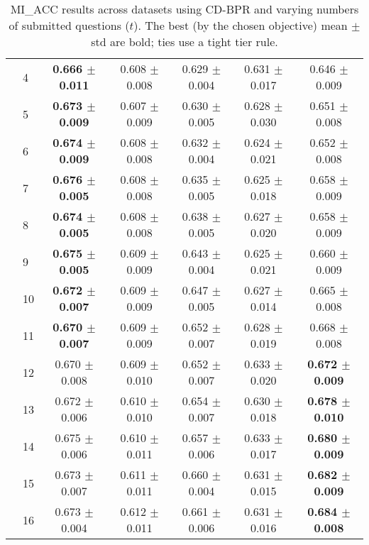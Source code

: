 \begin{table*}[t]
{\begin{tabular}{ll c c c c c}
        & 4 & \textbf{0.666 $\pm$ 0.011} & 0.608 $\pm$ 0.008 & 0.629 $\pm$ 0.004 & 0.631 $\pm$ 0.017 & 0.646 $\pm$ 0.009 \\
        & 5 & \textbf{0.673 $\pm$ 0.009} & 0.607 $\pm$ 0.009 & 0.630 $\pm$ 0.005 & 0.628 $\pm$ 0.030 & 0.651 $\pm$ 0.008 \\
        & 6 & \textbf{0.674 $\pm$ 0.009} & 0.608 $\pm$ 0.008 & 0.632 $\pm$ 0.004 & 0.624 $\pm$ 0.021 & 0.652 $\pm$ 0.008 \\
        & 7 & \textbf{0.676 $\pm$ 0.005} & 0.608 $\pm$ 0.008 & 0.635 $\pm$ 0.005 & 0.625 $\pm$ 0.018 & 0.658 $\pm$ 0.009 \\
        & 8 & \textbf{0.674 $\pm$ 0.005} & 0.608 $\pm$ 0.008 & 0.638 $\pm$ 0.005 & 0.627 $\pm$ 0.020 & 0.658 $\pm$ 0.009 \\
        & 9 & \textbf{0.675 $\pm$ 0.005} & 0.609 $\pm$ 0.009 & 0.643 $\pm$ 0.004 & 0.625 $\pm$ 0.021 & 0.660 $\pm$ 0.009 \\
        & 10 & \textbf{0.672 $\pm$ 0.007} & 0.609 $\pm$ 0.009 & 0.647 $\pm$ 0.005 & 0.627 $\pm$ 0.014 & 0.665 $\pm$ 0.008 \\
        & 11 & \textbf{0.670 $\pm$ 0.007} & 0.609 $\pm$ 0.009 & 0.652 $\pm$ 0.007 & 0.628 $\pm$ 0.019 & 0.668 $\pm$ 0.008 \\
        & 12 & 0.670 $\pm$ 0.008 & 0.609 $\pm$ 0.010 & 0.652 $\pm$ 0.007 & 0.633 $\pm$ 0.020 & \textbf{0.672 $\pm$ 0.009} \\
        & 13 & 0.672 $\pm$ 0.006 & 0.610 $\pm$ 0.010 & 0.654 $\pm$ 0.007 & 0.630 $\pm$ 0.018 & \textbf{0.678 $\pm$ 0.010} \\
        & 14 & 0.675 $\pm$ 0.006 & 0.610 $\pm$ 0.011 & 0.657 $\pm$ 0.006 & 0.633 $\pm$ 0.017 & \textbf{0.680 $\pm$ 0.009} \\
        & 15 & 0.673 $\pm$ 0.007 & 0.611 $\pm$ 0.011 & 0.660 $\pm$ 0.004 & 0.631 $\pm$ 0.015 & \textbf{0.682 $\pm$ 0.009} \\
        & 16 & 0.673 $\pm$ 0.004 & 0.612 $\pm$ 0.011 & 0.661 $\pm$ 0.006 & 0.631 $\pm$ 0.016 & \textbf{0.684 $\pm$ 0.008} \\
\bottomrule
\end{tabular}
}
\caption{MI_ACC results across datasets using CD-BPR and varying numbers of submitted questions ($t$). The best (by the chosen objective) mean $\pm$ std are bold; ties use a tight tier rule.}
\label{tab:results-mi_acc-cd-bpr}
\end{table*}
